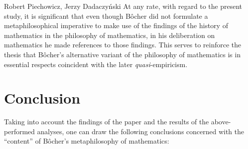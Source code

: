 \begin{artengenv}{Robert Piechowicz, Jerzy Dadaczyński}
At any rate, with regard to the present study, it is significant that even though Bôcher did not formulate a metaphilosophical imperative to make use of the findings of the history of mathematics in the philosophy of mathematics, in his deliberation on mathematics he made references to those findings. This serves to reinforce the thesis that Bôcher's alternative variant of the philosophy of mathematics is in essential respects coincident with the later \textit{quasi}-empiricism.

\section{Conclusion}
Taking into account the findings of the paper
\parencite[][]{dadaczynski_tendencje_2015}
 and the results of the above-performed analyses, one can draw the following conclusions concerned with the ``content'' of Bôcher's metaphilosophy of mathematics:


\end{artengenv}
